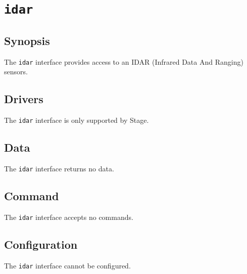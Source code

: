 \section{{\tt idar}}
\subsection*{Synopsis}
The {\tt idar} interface provides access to an IDAR (Infrared Data And
Ranging) sensors.

\subsection*{Drivers}
The {\tt idar} interface is only supported by Stage.

\subsection*{Data}
The {\tt idar} interface returns no data.

\subsection*{Command}
The {\tt idar} interface accepts no commands.

\subsection*{Configuration}
The {\tt idar} interface cannot be configured.
